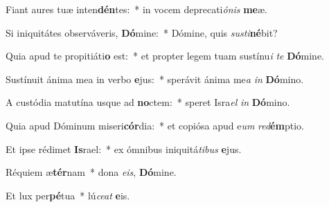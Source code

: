 \item Fiant aures tuæ inten\textbf{dén}tes:~* in vocem deprecati\hspace*{0.01em}\textit{ónis} \textbf{me}æ.
\item Si iniquitátes observáveris, \textbf{Dó}mine:~* Dómine, quis \textit{susti}\hspace{-0.01em}\textbf{né}bit?
\item Quia apud te propitiáti\textbf{o} est:~* et pro\-pter legem tuam sustínu\tinyhspace\textit{i} \textit{te} \textbf{Dó}mine.
\item Sustínuit ánima mea in verbo \textbf{e}jus:~* sperávit ánima me\tinyhspace\textit{a} \textit{in} \textbf{Dó}mino.
\item A custódia matutína usque ad \textbf{no}ctem:~* speret Isra\tinyhspace\textit{el} \textit{in} \textbf{Dó}mino.
\item Quia apud Dóminum miseri\textbf{cór}dia:~* et copiósa apud e\tinyhspace\textit{um} \textit{red}\textbf{ém}ptio.
\item Et ipse rédimet \textbf{Is}rael:~* ex ómnibus iniquitá\tinyhspace\textit{tibus} \textbf{e}jus.
\item Réquiem æ\textbf{tér}nam~* dona \textit{e}\textit{is}, \textbf{Dó}mine.
\item Et lux per\textbf{pé}tua~* lú\tinyhspace\textit{ce}\textit{at} \textbf{e}is.